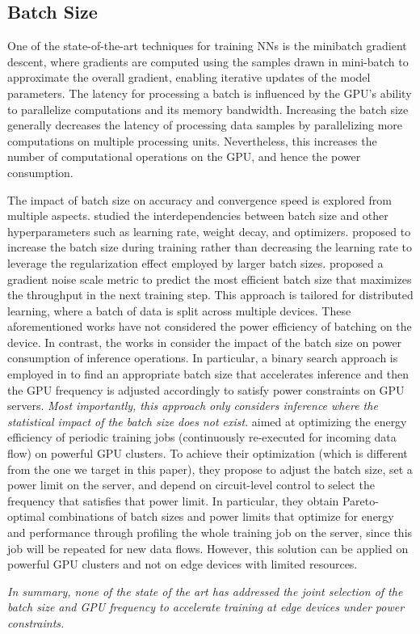 \subsection{Batch Size} 
One of the state-of-the-art techniques for training \acp{NN} is the minibatch gradient descent, where gradients are computed using the samples drawn in mini-batch to approximate the overall gradient, enabling iterative updates of the model parameters. 
The latency for processing a batch is influenced by the GPU's ability to parallelize computations and its memory bandwidth. 
Increasing the batch size generally decreases the latency of processing data samples by parallelizing more computations on multiple processing units. 
Nevertheless, this increases the number of computational operations on the GPU, and hence the power consumption. 

The impact of batch size on accuracy and convergence speed is explored from multiple aspects. \cite{goyal2017accurate, krizhevsky2014one, batch_size_and_optimizers} studied the interdependencies between batch size and other hyperparameters such as learning rate, weight decay, and optimizers. 
\cite{incraese_bs_training}  proposed to increase the batch size during training rather than decreasing the learning rate to leverage the regularization effect employed by larger batch sizes.  \cite{large_batch_size_training} proposed a gradient noise scale metric to predict the most efficient batch size that maximizes the throughput in the next training step. This approach is tailored for distributed learning, where a batch of data is split across multiple devices.
These aforementioned works have not considered the power efficiency of batching on the device. 
%
In contrast, the works in \cite{batch_sizer_inference,batch_dvfs_inference} consider the impact of the batch size on power consumption of inference operations. In particular, a binary search approach is employed in \cite{batch_dvfs_inference} to find an appropriate batch size that accelerates inference and then the GPU frequency is adjusted accordingly to satisfy power constraints on GPU servers. \textit{Most importantly, this approach only considers inference where the statistical impact of the batch size does not exist}.
\cite{zeus} aimed at optimizing the energy efficiency of periodic training jobs (continuously re-executed for incoming data flow) on powerful GPU clusters. To achieve their optimization (which is different from the one we target in this paper), they propose to adjust the batch size, set a power limit on the server, and depend on circuit-level control to select the frequency that satisfies that power limit.
In particular, they obtain Pareto-optimal combinations of batch sizes and power limits that optimize for energy and performance through profiling the whole training job on the server, since this job will be repeated for new data flows. However, this solution can be applied on powerful GPU clusters and not on edge devices with limited resources. 

\textit{
In summary, none of the state of the art has addressed the joint selection of the batch size and GPU frequency to accelerate training at edge devices under power constraints.}